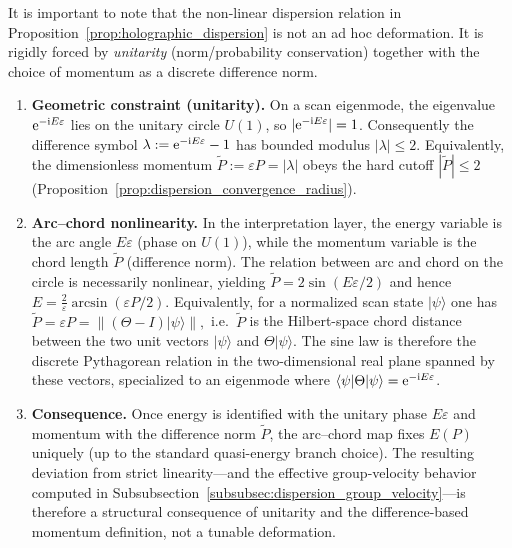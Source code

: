 \begin{remark}
It is important to note that the non-linear dispersion relation in Proposition~\ref{prop:holographic_dispersion} is not an ad hoc deformation. It is rigidly forced by \emph{unitarity} (norm/probability conservation) together with the choice of momentum as a discrete difference norm.
\begin{enumerate}
    \item \textbf{Geometric constraint (unitarity).} On a scan eigenmode, the eigenvalue $\mathrm{e}^{-\mathrm{i} E\varepsilon}$ lies on the unitary circle $U(1)$, so $|\mathrm{e}^{-\mathrm{i} E\varepsilon}|=1$. Consequently the difference symbol
    $
    \lambda:=\mathrm{e}^{-\mathrm{i} E\varepsilon}-1
    $
    has bounded modulus $|\lambda|\le 2$. Equivalently, the dimensionless momentum $\tilde P:=\varepsilon P=|\lambda|$ obeys the hard cutoff $|\tilde P|\le 2$ (Proposition~\ref{prop:dispersion_convergence_radius}).
    \item \textbf{Arc--chord nonlinearity.} In the interpretation layer, the energy variable is the arc angle $E\varepsilon$ (phase on $U(1)$), while the momentum variable is the chord length $\tilde P$ (difference norm). The relation between arc and chord on the circle is necessarily nonlinear, yielding
    $
    \tilde P=2\sin(E\varepsilon/2)
    $
    and hence $E=\frac{2}{\varepsilon}\arcsin(\varepsilon P/2)$.
    Equivalently, for a normalized scan state $|\psi\rangle$ one has
    $
    \tilde P=\varepsilon P=\|(\Theta-I)|\psi\rangle\|,
    $
    i.e.\ $\tilde P$ is the Hilbert-space chord distance between the two unit vectors $|\psi\rangle$ and $\Theta|\psi\rangle$.
    The sine law is therefore the discrete Pythagorean relation in the two-dimensional real plane spanned by these vectors, specialized to an eigenmode where $\langle \psi|\Theta|\psi\rangle=\mathrm{e}^{-\mathrm{i} E\varepsilon}$.
    \item \textbf{Consequence.} Once energy is identified with the unitary phase $E\varepsilon$ and momentum with the difference norm $\tilde P$, the arc--chord map fixes $E(P)$ uniquely (up to the standard quasi-energy branch choice). The resulting deviation from strict linearity---and the effective group-velocity behavior computed in Subsubsection~\ref{subsubsec:dispersion_group_velocity}---is therefore a structural consequence of unitarity and the difference-based momentum definition, not a tunable deformation.
\end{enumerate}


\end{remark}
